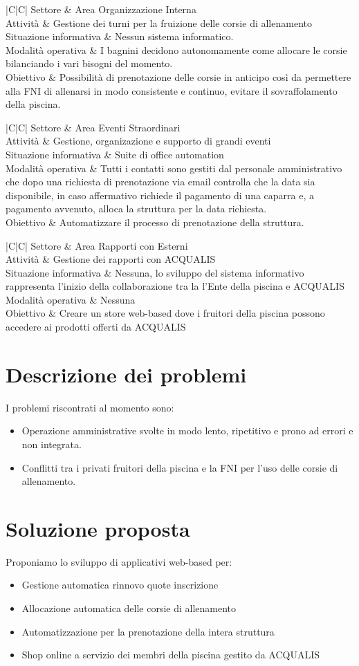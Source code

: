 \documentclass[11pt]{article} %
\newcommand{\AnalisiSituazioneAttualeTabella}[5]{
	\begin{tabulary}{\textwidth}{|C|C|}
		\hline
		Settore & #1 \\ \hline
		Attività & #2 \\ \hline
		Situazione informativa & #3 \\ \hline
		Modalità operativa & #4 \\ \hline
		Obiettivo & #5 \\
		\hline
	\end{tabulary}
}
\begin{document}
\AnalisiSituazioneAttualeTabella
	{Area Organizzazione Interna}
	{Gestione dei turni per la fruizione delle corsie di allenamento}
	{Nessun sistema informatico.}
	{I bagnini decidono autonomamente come allocare le corsie bilanciando i vari bisogni del momento.}
	{Possibilità di prenotazione delle corsie in anticipo così da permettere alla FNI di allenarsi in modo consistente e continuo, evitare il sovraffolamento della piscina.}

\AnalisiSituazioneAttualeTabella
	{Area Eventi Straordinari}
	{Gestione, organizazione e supporto di grandi eventi}
	{Suite di office automation}
	{Tutti i contatti sono gestiti dal personale amministrativo che dopo una richiesta di prenotazione via email controlla che la data sia disponibile, in caso affermativo richiede il pagamento di una caparra e, a pagamento avvenuto, alloca la struttura per la data richiesta.}
	{Automatizzare il processo di prenotazione della struttura.}

\AnalisiSituazioneAttualeTabella
	{Area Rapporti con Esterni}
	{Gestione dei rapporti con ACQUALIS}
	{Nessuna, lo sviluppo del sistema informativo rappresenta l'inizio della collaborazione tra la l'Ente della piscina e ACQUALIS}
	{Nessuna}
	{Creare un store web-based dove i fruitori della piscina possono accedere ai prodotti offerti da ACQUALIS}

\section{Descrizione dei problemi}

I problemi riscontrati al momento sono:

\begin{itemize}

	\item Operazione amministrative svolte in modo lento, ripetitivo e prono ad errori e non integrata.
	\item Conflitti tra i privati fruitori della piscina e la FNI per l'uso delle corsie di allenamento.

\end{itemize}

\section{Soluzione proposta}

Proponiamo lo sviluppo di applicativi web-based per:

\begin{itemize}
	\item Gestione automatica rinnovo quote inscrizione
	\item Allocazione automatica delle corsie di allenamento
	\item Automatizzazione per la prenotazione della intera struttura
	\item Shop online a servizio dei membri della piscina gestito da ACQUALIS
\end{itemize}	
\end{document}

